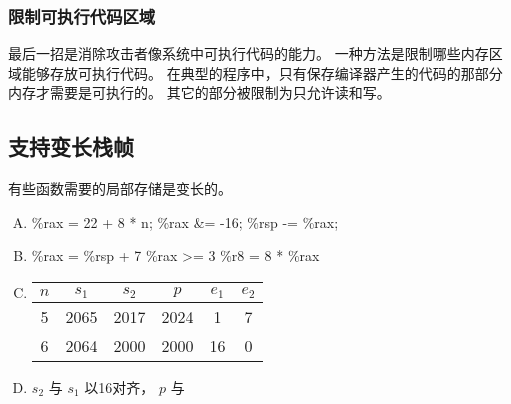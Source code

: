 {{        \subsubsection{限制可执行代码区域}
        {
            最后一招是消除攻击者像系统中可执行代码的能力。
            一种方法是限制哪些内存区域能够存放可执行代码。
            在典型的程序中，只有保存编译器产生的代码的那部分内存才需要是可执行的。
            其它的部分被限制为只允许读和写。
        }
    }

    \subsection{支持变长栈帧}
    {
        有些函数需要的局部存储是变长的。

        \begin{practicec}
            \begin{enumerate}[A.]
                \item
                {
                    \%rax = 22 + 8 * n;
                    \%rax \&= -16;
                    \%rsp -= \%rax;
                }
                \item
                {
                    \%rax = \%rsp + 7
                    \%rax >= 3
                    \%r8 = 8 * \%rax
                }
                \item
                {
                    \begin{table}[htb]
                        \begin{tabular}{|cccccc|}
                            \hline
                            $n$ & $s_1$ & $s_2$ & $p$ & $e_1$ & $e_2$ \\
                            \hline
                            5 & 2065 & 2017 & 2024 & 1 & 7 \\
                            6 & 2064 & 2000 & 2000 & 16 & 0 \\
                            \hline
                        \end{tabular}
                    \end{table}
                }
                \item
                {
                    $s_2$ 与 $s_1$ 以16对齐， $p$ 与
                }
            \end{enumerate}
        \end{practicec}
    }
}
